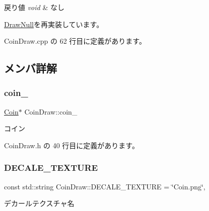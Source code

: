 \begin{DoxyRetVals}{戻り値}
{\em void} & なし \\
\hline
\end{DoxyRetVals}


\mbox{\hyperlink{class_draw_null_ad32a508d269de7eda8ad24ea72230464}{Draw\+Null}}を再実装しています。



 Coin\+Draw.\+cpp の 62 行目に定義があります。



\subsection{メンバ詳解}
\mbox{\label{class_coin_draw_a62baab6b1a22df45ce4c81970f4a38f4}} 
\subsubsection{\texorpdfstring{coin\+\_\+}{coin\_}}
{\footnotesize\ttfamily \mbox{\hyperlink{class_coin}{Coin}}$\ast$ Coin\+Draw\+::coin\+\_\+\hspace{0.3cm}{\ttfamily [private]}}



コイン 



 Coin\+Draw.\+h の 40 行目に定義があります。

\mbox{\label{class_coin_draw_a3c6a7373d27976867c12bbbd543e1567}} 
\subsubsection{\texorpdfstring{D\+E\+C\+A\+L\+E\+\_\+\+T\+E\+X\+T\+U\+RE}{DECALE\_TEXTURE}}
{\footnotesize\ttfamily const std\+::string Coin\+Draw\+::\+D\+E\+C\+A\+L\+E\+\_\+\+T\+E\+X\+T\+U\+RE = \char`\"{}Coin.\+png\char`\"{}\hspace{0.3cm}{\ttfamily [static]}, {\ttfamily [private]}}



デカールテクスチャ名 




